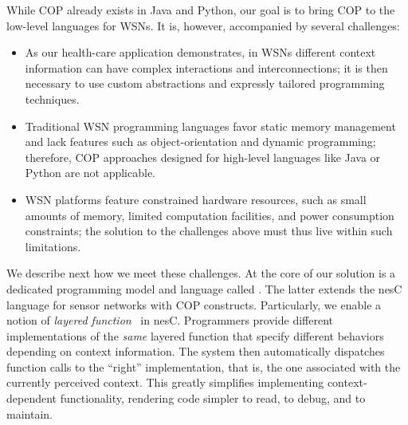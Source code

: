 While COP already exists in Java and Python, our goal is to bring COP to the low-level languages for WSNs. It is, however, accompanied by several challenges:
\begin{itemize}\compresslist
\item As our health-care application demonstrates, in WSNs
  different context information can have complex interactions and
  interconnections; it is then necessary to use custom abstractions
  and expressly tailored programming techniques.
\item Traditional WSN programming languages favor static memory
  management and lack features such as object-orientation and dynamic
  programming; therefore, COP approaches designed for high-level
  languages like Java or Python are not applicable.
\item WSN platforms feature constrained hardware resources, such as
  small amounts of memory, limited computation facilities, and power
  consumption constraints; the solution to the challenges above must
  thus live within such limitations.
\end{itemize}

We describe next how we meet these challenges. At the core of our
solution is a dedicated programming model and language called
{}. The latter extends the nesC~\cite{gay03:nesc}
language for sensor networks with COP constructs. Particularly, we
enable a notion of \emph{layered function}~\cite{hirschfeld08} in
nesC. Programmers provide different implementations of the \emph{same}
layered function that specify different behaviors depending on context
information. The system then automatically dispatches function calls
to the ``right'' implementation, that is, the one associated with the
currently perceived context. This greatly simplifies implementing
context-dependent functionality, rendering code simpler to read, to
debug, and to maintain.


